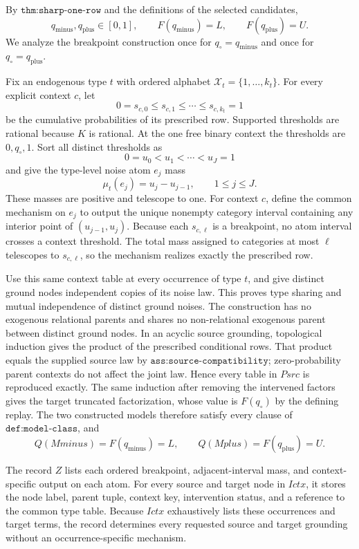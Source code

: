 By \(\texttt{thm:sharp-one-row}\) and the definitions of the selected candidates,
\[
 q_{\mathrm{minus}},q_{\mathrm{plus}}\in[0,1],
 \qquad
 F(q_{\mathrm{minus}})=L,
 \qquad
 F(q_{\mathrm{plus}})=U.
\]
We analyze the breakpoint construction once for \(q_\circ=q_{\mathrm{minus}}\) and once for \(q_\circ=q_{\mathrm{plus}}\).

Fix an endogenous type \(t\) with ordered alphabet \(\mathcal X_t=\{1,\ldots,k_t\}\).  For every explicit context \(c\), let
\[
 0=s_{c,0}\leq s_{c,1}\leq\cdots\leq s_{c,k_t}=1
\]
be the cumulative probabilities of its prescribed row.  Supported thresholds are rational because \(K\) is rational.  At the one free binary context the thresholds are \(0,q_\circ,1\).  Sort all distinct thresholds as
\[
 0=u_0<u_1<\cdots<u_J=1
\]
and give the type-level noise atom \(e_j\) mass
\[
 \mu_t(e_j)=u_j-u_{j-1},\qquad 1\leq j\leq J.
\]
These masses are positive and telescope to one.  For context \(c\), define the common mechanism on \(e_j\) to output the unique nonempty category interval containing any interior point of \((u_{j-1},u_j)\).  Because each \(s_{c,\ell}\) is a breakpoint, no atom interval crosses a context threshold.  The total mass assigned to categories at most \(\ell\) telescopes to \(s_{c,\ell}\), so the mechanism realizes exactly the prescribed row.

Use this same context table at every occurrence of type \(t\), and give distinct ground nodes independent copies of its noise law.  This proves type sharing and mutual independence of distinct ground noises.  The construction has no exogenous relational parents and shares no non-relational exogenous parent between distinct ground nodes.  In an acyclic source grounding, topological induction gives the product of the prescribed conditional rows.  That product equals the supplied source law by \(\texttt{ass:source-compatibility}\); zero-probability parent contexts do not affect the joint law.  Hence every table in \(Psrc\) is reproduced exactly.  The same induction after removing the intervened factors gives the target truncated factorization, whose value is \(F(q_\circ)\) by the defining replay.  The two constructed models therefore satisfy every clause of \(\texttt{def:model-class}\), and
\[
 Q(Mminus)=F(q_{\mathrm{minus}})=L,
 \qquad
 Q(Mplus)=F(q_{\mathrm{plus}})=U.
\]

The record \(Z\) lists each ordered breakpoint, adjacent-interval mass, and context-specific output on each atom.  For every source and target node in \(Ictx\), it stores the node label, parent tuple, context key, intervention status, and a reference to the common type table.  Because \(Ictx\) exhaustively lists these occurrences and target terms, the record determines every requested source and target grounding without an occurrence-specific mechanism.

